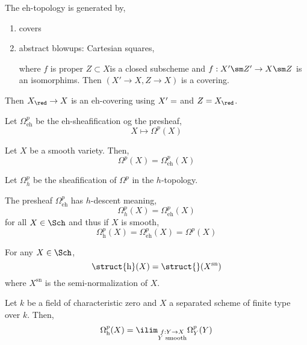 \documentclass[12pt]{article}
\begin{document}
\begin{defn}
The eh-topology is generated by,
\begin{enumerate}
\item \etale covers
\item abstract blowups: Cartesian squares,
\begin{center}
\end{center}
where $f$ is proper $Z \subset X$is a closed subscheme and $f : X' \sm Z' \to X \sm Z$ is an isomorphims. Then $(X' \to X, Z \to X)$ is a covering. 
\end{enumerate}
\end{defn}

\begin{rmk}
Then $X_{\red} \to X$ is an eh-covering using $X' = \empty$ and $Z = X_{\red}$.
\end{rmk}

\newcommand{\eh}{\mathrm{eh}}
\newcommand{\h}{\mathrm{h}}

\begin{defn}
Let $\Omega^p_{\eh}$ be the eh-sheafification og the presheaf,
\[ X \mapsto \Omega^p(X) \]
\end{defn}

\begin{prop}
Let $X$ be a smooth variety. Then,
\[ \Omega^p(X) = \Omega^p_{\eh}(X) \]
\end{prop}

\begin{defn}
Let $\Omega_h^p$ be the sheafification of $\Omega^p$ in the $h$-topology.
\end{defn}

\begin{theorem}
The presheaf $\Omega^p_{\eh}$ has $h$-descent meaning,
\[ \Omega^p_h(X) = \Omega^p_{\eh}(X) \]
for all $X \in \Sch$ and thus if $X$ is smooth,
\[ \Omega^p_{\h}(X) = \Omega^p_{\eh}(X) = \Omega^p(X) \]
\end{theorem}

\begin{prop}
For any $X \in \Sch$,
\[ \struct{\h}(X) = \struct{}(X^{\text{sn}}) \]
where $X^{\text{sn}}$ is the semi-normalization of $X$.
\end{prop}

\begin{theorem}
Let $k$ be a field of characteristic zero and $X$ a separated scheme of finite type over $k$. Then,
\[ \Omega^p_{\h}(X) = \ilim_{\substack{f : Y \to X \\ Y \text{ smooth}}} \Omega^p_Y(Y) \]
\end{theorem}
\end{document}
